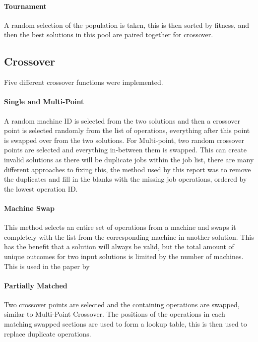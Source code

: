 \documentclass[14pt]{acmsiggraph}
\begin{document}
\paragraph{Tournament}
A random selection of the population is taken, this is then sorted by fitness, and then the best solutions in this pool are paired together for crossover.

\subsection{Crossover}
Five different crossover functions were implemented.
\paragraph{Single and Multi-Point}
A random machine ID is selected from the two solutions and then a crossover point is selected randomly from the list of operations, everything after this point is swapped over from the two solutions. For Multi-point, two random crossover points are selected and everything in-between them is swapped. This can create invalid solutions as there will be duplicate jobs within the job list, there are many different approaches to fixing this, the method used by this report was to remove the duplicates and fill in the blanks with the missing job operations, ordered by the lowest operation ID.

\paragraph{Machine Swap}
This method selects an entire set of operations from a machine and swaps it completely with the list from the corresponding machine in another solution. This has the benefit that a solution will always be valid, but the total amount of unique outcomes  for two input solutions is limited by the number of machines. This is used in the paper by \cite{wang2012new}

\paragraph{Partially Matched }
Two crossover points are selected and the containing operations are swapped, similar to Multi-Point Crossover. The positions of the operations in each matching swapped sections are used to form a lookup table, this is then used to replace duplicate operations.  \cite{sivanandam2007introduction}
\end{document}
